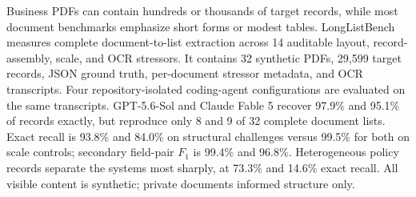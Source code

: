 Business PDFs can contain hundreds or thousands of target records, while most document benchmarks emphasize short forms or modest tables. LongListBench measures complete document-to-list extraction across 14 auditable layout, record-assembly, scale, and OCR stressors. It contains 32 synthetic PDFs, 29{,}599 target records, JSON ground truth, per-document stressor metadata, and OCR transcripts. Four repository-isolated coding-agent configurations are evaluated on the same transcripts. GPT-5.6-Sol and Claude Fable 5 recover 97.9\% and 95.1\% of records exactly, but reproduce only 8 and 9 of 32 complete document lists. Exact recall is 93.8\% and 84.0\% on structural challenges versus 99.5\% for both on scale controls; secondary field-pair $F_1$ is 99.4\% and 96.8\%. Heterogeneous policy records separate the systems most sharply, at 73.3\% and 14.6\% exact recall. All visible content is synthetic; private documents informed structure only.
